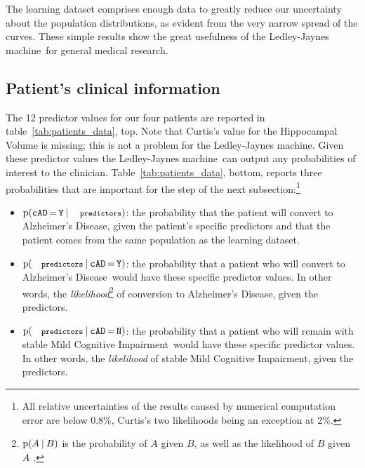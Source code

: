 \documentclass[utf8]{FrontiersinHarvard} %
\newcommand*{\mo}[1][=]{\mathord{\,#1\,}}
\newcommand*{\sect}{\S}%
\newcommand*{\p}{\mathrm{p}}%
\renewcommand*{\|}[1][]{\nonscript\:#1\vert\nonscript\:\mathopen{}}
\newcommand*{\cad}{\texttt{cAD}}
\newcommand*{\yes}{\texttt{Y}}
\newcommand*{\no}{\texttt{N}}
\newcommand*{\predictors}{\texttt{\footnotesize predictors}}
\newcommand*{\ad}{Alzheimer's Disease}
\newcommand*{\mci}{Mild Cognitive Impairment}
\newcommand*{\ljm}{Ledley-Jaynes machine}
\begin{document}
The learning dataset comprises enough data to greatly reduce our uncertainty about the population distributions, as evident from the very narrow spread of the curves. These simple results show the great usefulness of the \ljm\ for general medical research.


\subsection{Patient's clinical information}
\label{sec:predictor_step}

The 12 predictor values for our four patients are reported in table~\ref{tab:patients_data}, top. Note that Curtis's value for the Hippocampal Volume is missing; this is not a problem for the \ljm. Given these predictor values the \ljm\ can output any probabilities of interest to the clinician. Table~\ref{tab:patients_data}, bottom, reports three probabilities that are important for the step of the next subsection:\footnote{All relative uncertainties of the results caused by numerical computation error are below 0.8\%, Curtis's two likelihoods being an exception at 2\%.}
\begin{itemize}
\item $\p(\cad\mo\yes \| \predictors)$: the probability that the patient will convert to \ad, given the patient's specific predictors and that the patient comes from the same population as the learning dataset.
\item $\p(\predictors \| \cad\mo\yes)$: the probability that a patient who will convert to \ad\ would have these specific predictor values. In other words, the \emph{likelihood}\footnote{$\p(A\|B)$ is the probability of $A$ given $B$, as well as the likelihood of $B$ given $A$ \citep[\sect~6.1]{good1950}.} of conversion to \ad, given the predictors.
\item $\p(\predictors \| \cad\mo\no)$: the probability that a patient who will remain with stable \mci\ would have these specific predictor values. In other words, the \emph{likelihood} of stable \mci, given the predictors.
\end{itemize}
\end{document}
